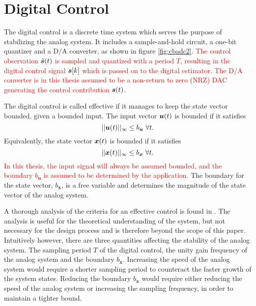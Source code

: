 \section{Digital Control}
\label{sec:04digcontrol}
The digital control is a discrete time system which serves the purpose of stabilizing the analog system. It includes a sample-and-hold circuit, a one-bit quantizer and a D/A converter, as shown in figure \ref{fig:cbadc2}.\textcolor{red}{ The control observation $\tilde{\bm{s}}(t)$ is sampled and quantized with a period $T$, resulting in the digital control signal $\bm{s}[k]$ which is passed on to the digital estimator. The D/A converter is in this thesis assumed to be a non-return to zero (NRZ) DAC generating the control contribution $\bm{s}(t)$.}

The digital control is called effective if it manages to keep the state vector bounded, given a bounded input. The input vector $\bm{u}(t)$ is bounded if it satisfies
\begin{equation}
    ||\bm{u}(t)||_{\infty} \leq b_{\bm{u}} \ \forall t.
\end{equation}
Equivalently, the state vector $\bm{x}(t)$ is bounded if it satisfies
\begin{equation}
    \label{eq:bx}
    ||\bm{x}(t)||_{\infty} \leq b_{\bm{x}} \ \forall t.
\end{equation}
\textcolor{red}{In this thesis, the input signal will always be assumed bounded, and the boundary $b_{\bm{u}}$ is assumed to be determined by the application.} The boundary for the state vector, $b_{\bm{x}}$, is a free variable and determines the magnitude of the state vector of the analog system.

A thorough analysis of the criteria for an effective control is found in \cite{malmberg_thesis}. The analysis is useful for the theoretical understanding of the system, but not necessary for the design process and is therefore beyond the scope of this paper. Intuitively however, there are three quantities affecting the stability of the analog system. The sampling period $T$ of the digital control, the unity gain frequency of the analog system and the boundary $b_{\bm{x}}$. Increasing the speed of the analog system would require a shorter sampling period to counteract the faster growth of the system states. Reducing the boundary $b_{\bm{x}}$ would require either reducing the speed of the analog system or increasing the sampling frequency, in order to maintain a tighter bound.

